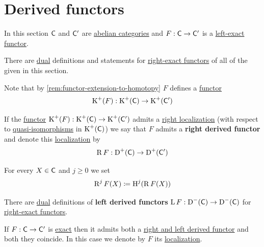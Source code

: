 \documentclass[../../main]{subfiles}
\begin{document}
\section{Derived functors}
In this section \(\mathsf{C}\) and \(\mathsf{C'}\) are \hyperref[def:abelian-category]{abelian categories} and \(F: \mathsf{C} \to \mathsf{C'}\) is a \hyperref[def:exact-functor]{left-exact functor}.

There are \hyperref[def:dual]{dual} definitions and statements for \hyperref[def:exact-functor]{right-exact functors} of all of the given in this section.

Note that by \autoref{rem:functor-extension-to-homotopy} \(F\) defines a \hyperref[def:functor]{functor}
\begin{equation*}
  \operatorname{K}^{+}(F): \operatorname{K}^{+}(\mathsf{C}) \to \operatorname{K}^{+}(\mathsf{C'})
\end{equation*}

\begin{definition}\label{def:right-derived-functor}
  If the \hyperref[def:functor]{functor} \(\operatorname{K}^{+}(F): \operatorname{K}^{+}(\mathsf{C}) \to \operatorname{K}^{+}(\mathsf{C'})\) admits a \hyperref[def:localization-functor]{right localization} (with respect to \hyperref[def:quasi-isomorphism]{quasi-isomorphisms} in \(\operatorname{K}^{+}(\mathsf{C})\)) we say that \(F\) admits a \textbf{right derived functor} and denote this \hyperref[def:localization-functor]{localization} by
  \begin{equation*}
    \operatorname{R}F: \operatorname{D}^{+}(\mathsf{C}) \to \operatorname{D}^{+}(\mathsf{C'})
  \end{equation*}

  For every \(X \in \mathsf{C}\) and \(j \geq 0\) we set
  \begin{equation*}
    \operatorname{R}^{j}F(X) \coloneq \operatorname{H}^{j}(\operatorname{R}F(X))
  \end{equation*}

  There are \hyperref[def:dual]{dual} definitions of \textbf{left derived functors} \(\operatorname{L}F: \operatorname{D}^{-}(\mathsf{C}) \to \operatorname{D}^{-}(\mathsf{C})\) for \hyperref[def:exact-functor]{right-exact functors}.
\end{definition}

\begin{notation}
  If \(F: \mathsf{C} \to \mathsf{C'}\) is \hyperref[def:exact-functor]{exact} then it admits both a \hyperref[def:right-derived-functor]{right and left derived functor} and both they coincide.
  In this case we denote by \(F\) its \hyperref[def:localization-functor]{localization}.
\end{notation}
\end{document}
